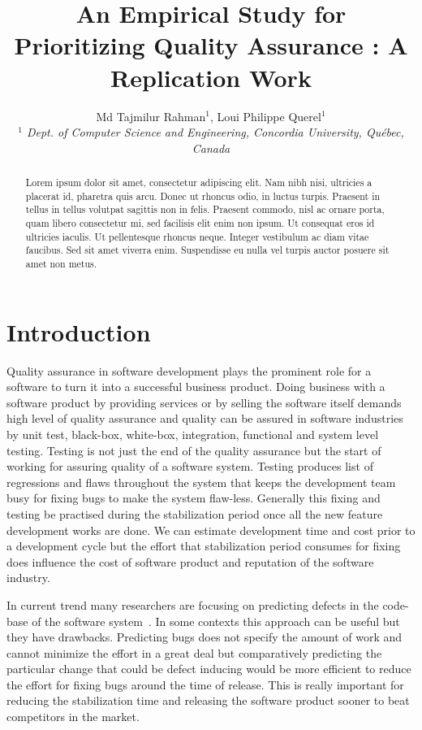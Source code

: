 \documentclass[10pt, conference]{IEEEtran}
\title{An Empirical Study for Prioritizing Quality Assurance : A Replication Work}
\author{Md Tajmilur Rahman$^{1}$, Loui Philippe Querel$^{1}$
    \\
	\emph{$^{1}$ Dept. of Computer Science and Engineering, Concordia University, Qu\'{e}bec, Canada}
}
\begin{document}
\maketitle

\begin{abstract}
Lorem ipsum dolor sit amet, consectetur adipiscing elit. Nam nibh nisi, ultricies a placerat id, pharetra quis arcu. Donec ut rhoncus odio, in luctus turpis. Praesent in tellus in tellus volutpat sagittis non in felis. Praesent commodo, nisl ac ornare porta, quam libero consectetur mi, sed facilisis elit enim non ipsum. Ut consequat eros id ultricies iaculis. Ut pellentesque rhoncus neque. Integer vestibulum ac diam vitae faucibus. Sed sit amet viverra enim. Suspendisse eu nulla vel turpis auctor posuere sit amet non metus.
\end{abstract}

\section{Introduction}
\label{sec:introduction}

Quality assurance in software development plays the prominent role for a software to turn it into a successful business product. Doing business with a software product by providing services or by selling the software itself demands high level of quality assurance and quality can be assured in software industries by unit test, black-box, white-box, integration, functional and system level testing. Testing is not just the end of the quality assurance but the start of working for assuring quality of a software system. Testing produces list of regressions and flaws throughout the system that keeps the development team busy for fixing bugs to make the system flaw-less. Generally this fixing and testing be practised during the stabilization period once all the new feature development works are done. We can estimate development time and cost prior to a development cycle but the effort that stabilization period consumes for fixing does influence the cost of software product and reputation of the software industry.

In current trend many researchers are focusing on predicting defects in the code-base of the software system~\cite{Gyimothy2005IEEE}. In some contexts this approach can be useful but they have drawbacks. Predicting bugs does not specify the amount of work and cannot minimize the effort in a great deal but comparatively predicting the particular change that could be defect inducing would be more efficient to reduce the effort for fixing bugs around the time of release. This is really important for reducing the stabilization time and releasing the software product sooner to beat competitors in the market.
\end{document}

